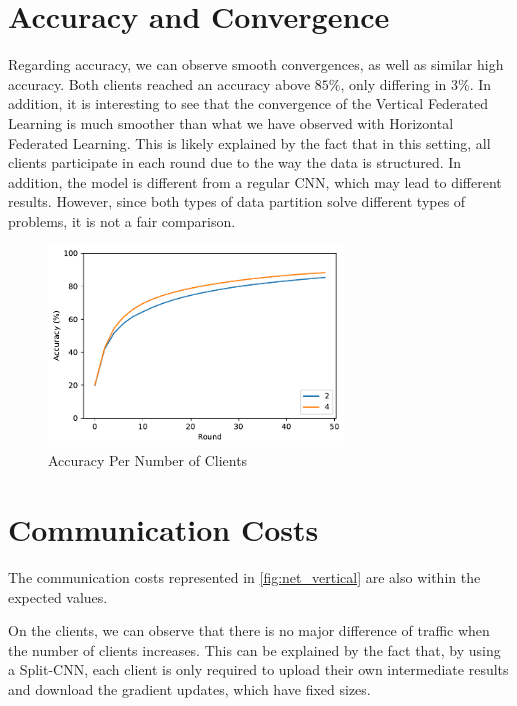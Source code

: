 \section{Accuracy and Convergence}

Regarding accuracy, we can observe smooth convergences, as well as similar high accuracy. Both clients reached an accuracy above $85\%$, only differing in $3\%$. In addition, it is interesting to see that the convergence of the Vertical Federated Learning is much smoother than what we have observed with Horizontal Federated Learning. This is likely explained by the fact that in this setting, all clients participate in each round due to the way the data is structured. In addition, the model is different from a regular CNN, which may lead to different results. However, since both types of data partition solve different types of problems, it is not a fair comparison.

\begin{figure}[!ht]
    \centering
    \centering
    \includegraphics[width=0.7\textwidth]{graphics/vertical/accuracy.pdf}
    \caption{Accuracy Per Number of Clients}
    \label{fig:accuracy_vertical}
\end{figure}

\section{Communication Costs}

The communication costs represented in \autoref{fig:net_vertical} are also within the expected values.

On the clients, we can observe that there is no major difference of traffic when the number of clients increases. This can be explained by the fact that, by using a Split-CNN, each client is only required to upload their own intermediate results and download the gradient updates, which have fixed sizes.

